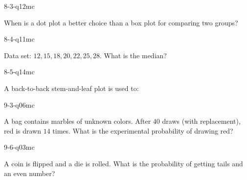 \begin{practiceQuestion}{8-3-q12}{mc}
\begin{questionText}
When is a dot plot a better choice than a box plot for comparing two groups?
\end{questionText}
\end{practiceQuestion}

\begin{practiceQuestion}{8-4-q11}{mc}
\begin{questionText}
Data set: $12, 15, 18, 20, 22, 25, 28$. What is the median?
\end{questionText}
\end{practiceQuestion}

\begin{practiceQuestion}{8-5-q14}{mc}
\begin{questionText}
A back-to-back stem-and-leaf plot is used to:
\end{questionText}
\end{practiceQuestion}

\begin{practiceQuestion}{9-3-q06}{mc}
\begin{questionText}
A bag contains marbles of unknown colors. After $40$ draws (with replacement), red is drawn $14$ times. What is the experimental probability of drawing red?
\end{questionText}
\end{practiceQuestion}

\begin{practiceQuestion}{9-6-q03}{mc}
\begin{questionText}
A coin is flipped and a die is rolled. What is the probability of getting tails and an even number?
\end{questionText}
\end{practiceQuestion}

